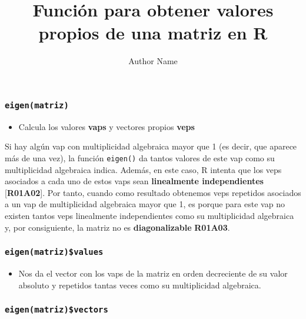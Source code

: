 \documentclass[
]{article}
\title{Función para obtener valores propios de una matriz en R}
\author{Author Name}
\date{}
\providecommand{\tightlist}{%
  \setlength{\itemsep}{0pt}\setlength{\parskip}{0pt}}
\begin{document}
\let\maketitle\relax  
\leading{6.5mm} 
\setlength\baselineskip{6.5mm} 
\setlength\lineskiplimit{-\maxdimen}

\maketitle

\hypertarget{eigenmatriz}{%
\subsubsection{\texorpdfstring{\texttt{eigen(matriz)}}{eigen(matriz)}}\label{eigenmatriz}}

\begin{itemize}
\tightlist
\item
  Calcula los valores \textbf{vaps} y vectores propios \textbf{veps}
\end{itemize}

Si hay algún vap con multiplicidad algebraica mayor que 1 (es decir, que
aparece más de una vez), la función \texttt{eigen()} da tantos valores
de este vap como su multiplicidad algebraica indica. Además, en este
caso, R intenta que los veps asociados a cada uno de estos vaps sean
\textbf{linealmente independientes} {[}\textbf{R01A02}{]}. Por tanto,
cuando como resultado obtenemos veps repetidos asociados a un vap de
multiplicidad algebraica mayor que 1, es porque para este vap no existen
tantos veps linealmente independientes como su multiplicidad algebraica
y, por consiguiente, la matriz no es \textbf{diagonalizable}
\textbf{R01A03}.

\hypertarget{eigenmatrizvalues}{%
\subsubsection{\texorpdfstring{\texttt{eigen(matriz)\$values}}{eigen(matriz)\$values}}\label{eigenmatrizvalues}}

\begin{itemize}
\tightlist
\item
  Nos da el vector con los vaps de la matriz en orden decreciente de su
  valor absoluto y repetidos tantas veces como su multiplicidad
  algebraica.
\end{itemize}

\hypertarget{eigenmatrizvectors}{%
\subsubsection{\texorpdfstring{\texttt{eigen(matriz)\$vectors}}{eigen(matriz)\$vectors}}\label{eigenmatrizvectors}}
\end{document}
